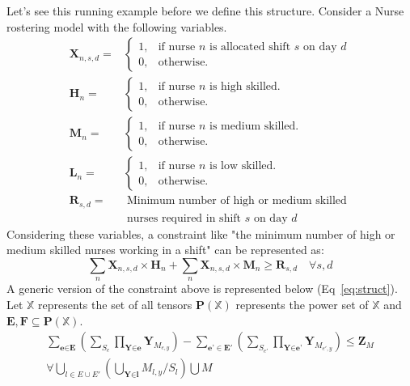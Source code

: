 \documentclass{article}
\newcommand{\stefano}[1]{{\bf \textcolor{violet}{{Stefano: #1}}}}
\newcommand{\TX}{\textbf{X}\xspace}
\newcommand{\TY}{\textbf{Y}\xspace}
\newcommand{\TZ}{\textbf{Z}\xspace}
\newcommand{\TP}{\textbf{P}\xspace}
\newcommand{\TE}{\textbf{E}\xspace}
\newcommand{\TF}{\textbf{F}\xspace}
\begin{document}
Let's see this running example before we define this structure. Consider a Nurse rostering model with the following variables.
%
\begin{align*}
  \TX_{n,s,d} = & \begin{cases}
    1, & \text{if nurse $n$ is allocated shift $s$ on day $d$}\\
    0, & \text{otherwise}.
  \end{cases}\\
  \textbf{H}_{n} = & \begin{cases}
    1, & \text{if nurse $n$ is high skilled}.\\
    0, & \text{otherwise}.
  \end{cases}\\
  \textbf{M}_{n} = & \begin{cases}
    1, & \text{if nurse $n$ is medium skilled}.\\
    0, & \text{otherwise}.
  \end{cases}\\
  \textbf{L}_{n} = & \begin{cases}
    1, & \text{if nurse $n$ is low skilled}.\\
    0, & \text{otherwise}.
  \end{cases}\\
  \textbf{R}_{s,d} =
    & \; \text{Minimum number of high or medium skilled}\\ 
    & \; \text{nurses required in shift $s$ on day $d$}
\end{align*}
%
Considering these variables, a constraint like "the minimum number of high or medium skilled nurses working in a shift" can be represented as:
\begin{equation}
\label{eq:const}
\sum_{n} \TX_{n,s,d} \times \textbf{H}_{n} + \sum_{n} \TX_{n,s,d} \times \textbf{M}_{n} \geq \textbf{R}_{s,d} \quad \forall s,d
\end{equation}
%
A generic version of the constraint above is represented below (Eq~\ref{eq:struct}).
Let $\mathbb{X}$ represents the set of all tensors 
$\TP(\mathbb{X})$ represents the power set of $\mathbb{X}$ and $\TE,\TF \subseteq \TP(\mathbb{X})$.
\begin{multline}
\label{eq:struct}
	\displaystyle\sum\limits_{\textbf{e} \in \TE}(\sum_{S_e}\prod_{\TY \in \textbf{e}} \TY_{M_{e,y}}) 
	-\sum\limits_{\textbf{e'} \in \TE'}(\sum_{S_{e'}}\prod_{\TY \in \textbf{e'}} \TY_{M_{e',y}}) \le \TZ_{M}\\
	\forall \bigcup_{l \in E \cup E'}(\bigcup_{\TY \in \textbf{l}} M_{l,y} / S_l) \bigcup M
\end{multline}
\end{document}
